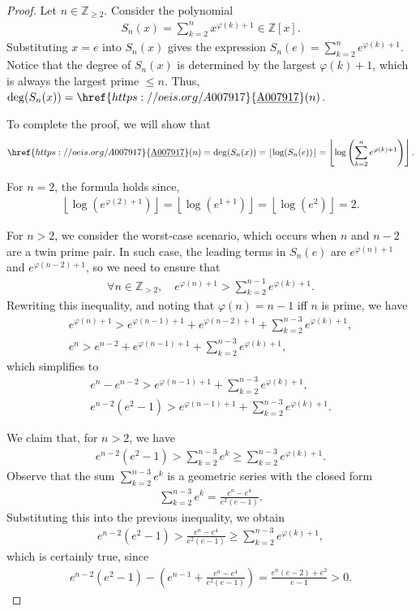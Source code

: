 \documentclass[10pt,a4paper]{article}
\theoremstyle{plain}
\newcommand{\floor}[1]{\left\lfloor #1 \right\rfloor}
\newcommand{\Z}{\mathbb{Z}}
\newcommand{\seqnum}[1]{\href{https://oeis.org/#1}{\rm \underline{#1}}}
\begin{document}
\begin{proof}
Let $n \in \Z_{\geq 2}$. Consider the polynomial
\begin{align*}
S_n(x) = \sum_{k=2}^n x^{\varphi(k)+1} \in \Z[x].
\end{align*}
Substituting $x = e$ into $S_n(x)$ gives the expression $S_n(e) = \sum_{k=2}^n e^{\varphi(k)+1}$. Notice that the degree of $S_n(x)$ is determined by the largest $\varphi(k) + 1$, which is always the largest prime $\leq n$. Thus, $\deg(S_n(x)) = \seqnum{A007917}(n)$.

To complete the proof, we will show that 
\begin{align*}
\seqnum{A007917}(n) = \deg(S_n(x)) = \floor{\log(S_n(e))} = \floor{ \log\left( \sum_{k=2}^n e^{\varphi(k)+1} \right) } .
\end{align*}

For $n=2$, the formula holds since,
\begin{align*}
    \floor{\log(e^{\varphi(2)+1})} = \floor{\log(e^{1+1})} = \floor{\log(e^2)} = 2 .
\end{align*}

For $n > 2$, we consider the worst-case scenario, which occurs when $n$ and $n-2$ are a twin prime pair. In such case, the leading terms in $S_n(e)$ are $e^{\varphi(n)+1}$ and $e^{\varphi(n-2)+1}$, so we need to ensure that
\begin{align*}
\forall n \in \Z_{>2}, \quad
e^{\varphi(n)+1} > \sum_{k=2}^{n-1} e^{\varphi(k)+1} .
\end{align*}
Rewriting this inequality, and noting that $\varphi(n) = n-1$ iff $n$ is prime, we have
\begin{align*}
e^{\varphi(n)+1} > e^{\varphi(n-1)+1} + e^{\varphi(n-2)+1} + \sum_{k=2}^{n-3} e^{\varphi(k)+1} , \\
e^n > e^{n-2} + e^{\varphi(n-1)+1} + \sum_{k=2}^{n-3} e^{\varphi(k)+1} ,
\end{align*}
which simplifies to
\begin{align*}
e^n - e^{n-2} > e^{\varphi(n-1)+1} + \sum_{k=2}^{n-3} e^{\varphi(k)+1} , \\
e^{n-2} (e^2-1) > e^{\varphi(n-1)+1} + \sum_{k=2}^{n-3} e^{\varphi(k)+1}.
\end{align*}

We claim that, for $n > 2$, we have
\begin{align*}
e^{n-2} (e^2-1) > \sum_{k=2}^{n-3} e^k \geq \sum_{k=2}^{n-3} e^{\varphi(k)+1}.
\end{align*}
Observe that the sum $\sum_{k=2}^{n-3} e^k$ is a geometric series with the closed form
\begin{align*}
\sum_{k=2}^{n-3} e^k = \frac{e^n-e^4}{e^2(e-1)} .
\end{align*}
Substituting this into the previous inequality, we obtain
\begin{align*}
e^{n-2} (e^2-1) > \frac{e^n-e^4}{e^2(e-1)} \geq \sum_{k=2}^{n-3} e^{\varphi(k)+1} ,
\end{align*}
which is certainly true, since
\begin{align*}
    e^{n-2} (e^2-1) - \left(e^{n-1} + \frac{e^n-e^4}{e^2(e-1)}\right) = \frac{e^n (e-2) + e^2}{e-1} > 0 .
\end{align*}


\end{proof}
\end{document}
